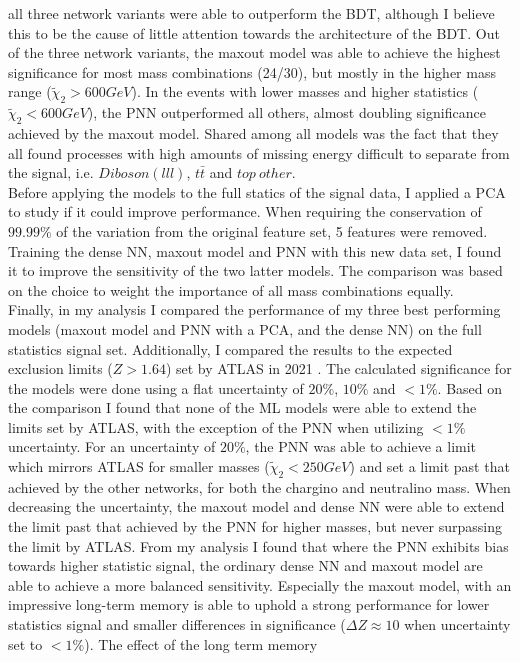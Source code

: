 all three network variants were able to outperform the \ac{BDT}, although I believe this to be the cause of little attention towards the architecture of the \ac{BDT}. Out of the three network variants, the maxout model was able to achieve 
the highest significance for most mass combinations (24/30), but mostly in the higher mass range ($\tilde{\chi}_2>600GeV$). In the events with lower masses and higher statistics ($\tilde{\chi}_2<600GeV$), the \ac{PNN} outperformed all others, 
almost doubling significance achieved by the maxout model. Shared among all models was the fact that they all found processes with high amounts of missing energy difficult to separate from the signal, i.e. $Diboson(lll)$, $t\bar{t}$ and $top\ other$.
\\
Before applying the models to the full statics of the signal data, I applied a \ac{PCA} to study if it could improve performance. When requiring the conservation of $99.99\%$ of the variation from the original feature set, 5 features were removed.
Training the dense \ac{NN}, maxout model and \ac{PNN} with this new data set, I found it to improve the sensitivity of the two latter models. The comparison was based on the choice to weight the importance of all mass combinations equally.
\\
Finally, in my analysis I compared the performance of my three best performing models (maxout model and \ac{PNN} with a \ac{PCA}, and the dense \ac{NN}) on the full statistics signal set. Additionally, I compared the results to the expected exclusion 
limits ($Z>1.64$) set by \ac{ATLAS} in 2021 \cite{atlas_search_2021}. The calculated significance for the models were done using a flat uncertainty of $20\%$, $10\%$ and $<1\%$. Based on the comparison I found that none of the \ac{ML} models were 
able to extend the limits set by \ac{ATLAS}, with the exception of the \ac{PNN} when utilizing $<1\%$ uncertainty. For an uncertainty of $20\%$, the \ac{PNN} was able to achieve a limit which mirrors \ac{ATLAS} for smaller masses ($\tilde{\chi}_2<250GeV$)
and set a limit past that achieved by the other networks, for both the chargino and neutralino mass. When decreasing the uncertainty, the maxout model and dense \ac{NN} were able to extend the limit past that achieved by the \ac{PNN} for higher masses, 
but never surpassing the limit by \ac{ATLAS}. From my analysis I found that where the \ac{PNN} exhibits bias towards higher statistic signal, the ordinary dense \ac{NN} and maxout model are able to achieve a more balanced sensitivity. Especially the 
maxout model, with an impressive long-term memory is able to uphold a strong performance for lower statistics signal and smaller differences in significance ($\Delta Z \approx 10$ when uncertainty set to $<1\%$). The effect of the long term memory 

